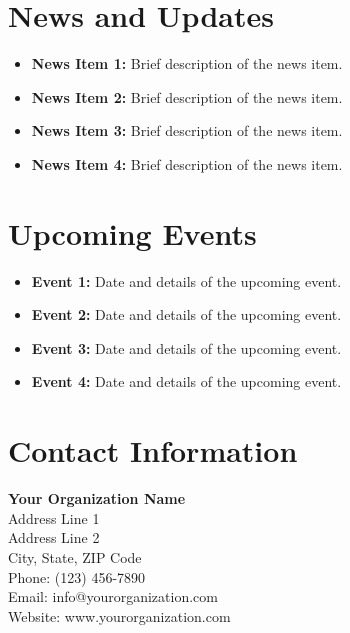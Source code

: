 \documentclass{article}
\begin{document}
\section*{News and Updates}
\begin{itemize}
    \item \textbf{News Item 1:} Brief description of the news item.
    \item \textbf{News Item 2:} Brief description of the news item.
    \item \textbf{News Item 3:} Brief description of the news item.
    \item \textbf{News Item 4:} Brief description of the news item.
\end{itemize}

\section*{Upcoming Events}
\begin{itemize}
    \item \textbf{Event 1:} Date and details of the upcoming event.
    \item \textbf{Event 2:} Date and details of the upcoming event.
    \item \textbf{Event 3:} Date and details of the upcoming event.
    \item \textbf{Event 4:} Date and details of the upcoming event.
\end{itemize}

\section*{Contact Information}
\textbf{Your Organization Name} \\
Address Line 1 \\
Address Line 2 \\
City, State, ZIP Code \\
Phone: (123) 456-7890 \\
Email: info@yourorganization.com \\
Website: www.yourorganization.com
\end{document}
